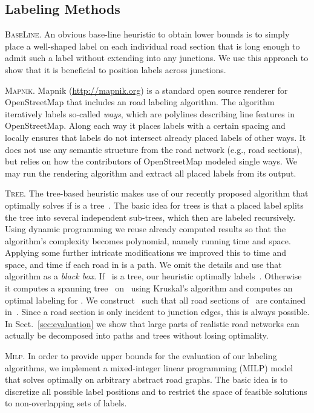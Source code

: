 \documentclass[a4paper,11pt]{article}
\newcommand{\myparagraph}[1]{\vspace*{.8ex}\noindent #1}
\newcommand{\GreedyAlgo}{\textsc{Base\-Line}\xspace}
\newcommand{\TreeAlgo}{\textsc{Tree}\xspace}
\newcommand{\ILPAlgo}{\textsc{Milp}\xspace}
\begin{document}
\subsection{Labeling Methods}


\myparagraph{\GreedyAlgo.} An obvious base-line heuristic to obtain lower bounds is to simply place a well-shaped label on each individual road section that is long enough to admit such a label without extending into any junctions. We use this approach to show that it is beneficial to position labels across junctions.
 
\myparagraph{\textsc{Mapnik}.} Mapnik (\url{http://mapnik.org}) is a standard
open source renderer for OpenStreetMap that includes an road labeling algorithm.
The algorithm iteratively labels so-called \emph{ways}, which are
polylines describing line features in OpenStreetMap. Along each way it
places labels with a certain spacing and locally ensures that labels
do not intersect already placed labels of other ways.  It does not use any semantic structure from the road network (e.g., road sections), but
relies on how the contributors of OpenStreetMap modeled single ways. We may run the rendering algorithm and extract all placed labels from its output. 

\myparagraph{\TreeAlgo.}
The tree-based heuristic makes use of our recently proposed algorithm 
that optimally solves \MaxTotalCovering if  is a tree~\cite{rlTheory}. The basic idea for trees is that a
placed label splits the tree into several independent sub-trees, which then are
labeled recursively. Using dynamic programming we reuse already
computed results so that the algorithm's complexity becomes
polynomial, namely  running time and  space. Applying
some further intricate modifications we improved this to  time
and  space, and  time if each road in  is a path. We omit the details and use that algorithm as a \emph{black
  box}. If~ is a tree, our heuristic optimally labels~. Otherwise it computes
a spanning tree~ on~ using Kruskal's algorithm and computes an
optimal labeling for . We
construct~ such that all road sections of~ are contained
in~. Since a road section is only incident to junction edges, this
is always possible. In
Sect.~\ref{sec:evaluation} we show that large parts of realistic road
networks can actually be decomposed into paths and trees without losing
optimality. 



\myparagraph{\ILPAlgo.} In order to provide upper bounds for the
evaluation of our labeling algorithms, we implement a mixed-integer linear programming (MILP) model that solves \MaxTotalCovering optimally on arbitrary abstract road
graphs. The basic idea is to discretize all possible label positions and to
restrict the space of feasible solutions to non-overlapping sets of
labels.
\end{document}
